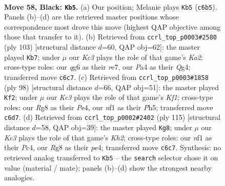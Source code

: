 \documentclass[11pt]{article}
\begin{document}
\clearpage

\begin{figure}[p]\centering
\begin{subfigure}{0.46\textwidth}\centering
\resizebox{\linewidth}{!}{%
\newchessgame
\chessboard[
  setfen={1r4r1/p5p1/2k3Qp/3p3P/p2P2P1/q3P3/7K/4bN2 b - - 25 58},
  showmover=false,
  pgfstyle=straightmove, color=movearrow, markmove={c6-b5}
]}
\caption{}
\end{subfigure}\hfill
\begin{subfigure}{0.46\textwidth}\centering
\resizebox{\linewidth}{!}{%
\newchessgame
\chessboard[
  setfen={2r5/k1p1R3/3p3p/2pP4/Q1P3q1/P4p2/1P6/1K6 b - - 1 52},
  showmover=false,
  pgfstyle=straightmove, color=movearrow, markmove={a7-b7}
]}
\caption{}
\end{subfigure}
\\[4pt]
\begin{subfigure}{0.46\textwidth}\centering
\resizebox{\linewidth}{!}{%
\newchessgame
\chessboard[
  setfen={2R2nk1/2Q2pp1/1p2p2p/7P/4P3/P4P2/6P1/3q1K2 w - - 6 50},
  showmover=false,
  pgfstyle=straightmove, color=movearrow, markmove={f1-f2}
]}
\caption{}
\end{subfigure}\hfill
\begin{subfigure}{0.46\textwidth}\centering
\resizebox{\linewidth}{!}{%
\newchessgame
\chessboard[
  setfen={8/5ppk/7p/5Q2/2p1P2P/2P2P2/r2r2PK/8 b - - 8 58},
  showmover=false,
  pgfstyle=straightmove, color=movearrow, markmove={h7-g8}
]}
\caption{}
\end{subfigure}
\caption{\textbf{Move 58, Black: \texttt{Kb5}.} (a) Our position; Melanie plays \texttt{Kb5} (\texttt{c6b5}). Panels (b)--(d) are the retrieved master positions whose correspondence most drove this move (highest QAP objective among those that transfer to it). (b) Retrieved from \texttt{ccrl\_top\_p0003\#2580} (ply 103) [structural distance $d$=60, QAP obj=62]: the master played \texttt{Kb7}; under $\mu$ our \emph{Kc3} plays the role of that game's \emph{Ka2}; cross-type roles: our \emph{q}g6 as their \emph{r}e7, our \emph{P}a4 as their \emph{Q}g4; transferred move \texttt{c6c7}. (c) Retrieved from \texttt{ccrl\_top\_p0003\#1858} (ply 98) [structural distance $d$=66, QAP obj=51]: the master played \texttt{Kf2}; under $\mu$ our \emph{Kc3} plays the role of that game's \emph{Kf1}; cross-type roles: our \emph{R}g8 as their \emph{P}e4, our \emph{n}f1 as their \emph{P}h5; transferred move \texttt{c6d7}. (d) Retrieved from \texttt{ccrl\_top\_p0002\#2402} (ply 115) [structural distance $d$=58, QAP obj=39]: the master played \texttt{Kg8}; under $\mu$ our \emph{Kc3} plays the role of that game's \emph{Kh2}; cross-type roles: our \emph{n}f1 as their \emph{P}c4, our \emph{R}g8 as their \emph{p}e4; transferred move \texttt{c6c7}. Synthesis: no retrieved analog transferred to \texttt{Kb5} -- the \texttt{search} selector chose it on value (material / mate); panels (b)--(d) show the strongest nearby analogies.}
\label{fig:thought-m115}
\end{figure}
\end{document}
